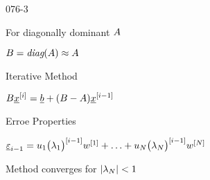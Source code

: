 \begin{mitframe}{076-3}
 \begin{listone}
	\item For diagonally dominant $\helmholtz$
    	\begin{listtwo}
        	\item $\exergy=\textit{diag}(\helmholtz)\approx\helmholtz$
        \end{listtwo}
\item Iterative Method
		\begin{listtwo}
        \item $\exergy\uline{\disp}^{[\state]}=\uline{b}+
        (\exergy-\helmholtz)\uline{\disp}^{[\state-1]}$        \end{listtwo}
\item Erroe Properties
		\begin{listtwo}
        	\item $\uline{\varepsilon}_{\state-1}=\forcepot_1\big(\lambda_1\big)^{[\state-1]}w^{[1]}+\ldots+\forcepot_{\nummoles}\big(\lambda_{\nummoles}\big)^{[\state-1]}w^{[\nummoles]}$
            \item Method converges for $|\lambda_{\nummoles}|<1$
        \end{listtwo}
\end{listone}
\end{mitframe}